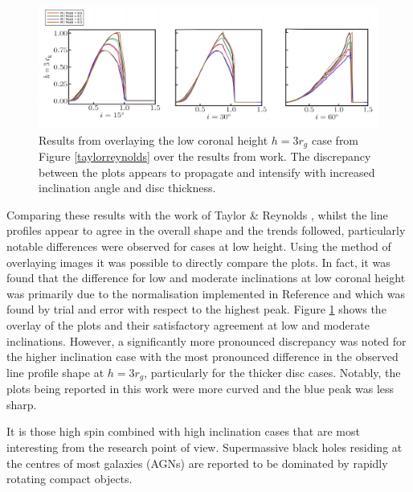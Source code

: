 \documentclass[fleqn,usenatbib,useAMS]{mnras}
\begin{document}
\begin{figure}
    \centering
    \includegraphics[width=0.98\linewidth]{figures/overlay.png}
    \caption{Results from overlaying the low coronal height $h = 3 r_{g}$ case from Figure \ref{taylorreynolds} over the results from \cite{taylor2018exploring} work. The discrepancy between the plots appears to propagate and intensify with increased inclination angle and disc thickness.}
    \label{overlay}
\end{figure}

Comparing these results with the work of Taylor \& Reynolds \cite{taylor2018exploring}, whilst the line profiles appear to agree in the overall shape and the trends followed, particularly notable differences were observed for cases at low height. Using the method of overlaying images it was possible to directly compare the plots. In fact, it was found that the difference for low and moderate inclinations at low coronal height was primarily due to the normalisation implemented in Reference \cite{taylor2018exploring} and which was found by trial and error with respect to the highest peak. Figure \ref{overlay} shows the overlay of the plots and their satisfactory agreement at low and moderate inclinations. However, a significantly more pronounced discrepancy was noted for the higher inclination case with the most pronounced difference in the observed line profile shape at $h=3 r_{g}$, particularly for the thicker disc cases. Notably, the plots being reported in this work were more curved and the blue peak was less sharp. 

It is those high spin combined with high inclination cases that are most interesting from the research point of view. Supermassive black holes residing at the centres of most galaxies (AGNs) are reported to be dominated by rapidly rotating compact objects\cite{reynolds2015measuring}.
\end{document}
